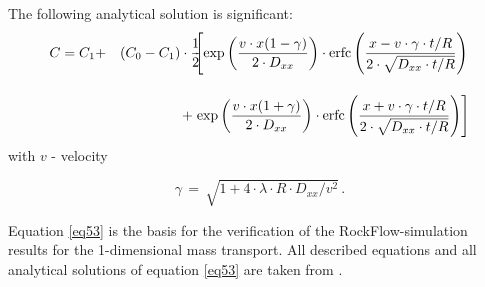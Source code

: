 The following analytical solution is significant:
\begin{eqnarray}
C=C_1&+&\left(C_0-C_1\right)\cdot\frac{1}{2}
\mbox{\hspace{-1.5ex}}\cdot\mbox{\hspace{-1.5ex}}
\left[
\exp
\left(
\frac{v\cdot x(1-\gamma)}{2\cdot D_{xx}}
\right)
\cdot\mathrm{erfc}
\left(
\frac{x-v\cdot\gamma\cdot t/R}{2\cdot \sqrt{D_{xx}\cdot t/R}}
\right)
\right. \nonumber\\[2.5ex]
& &
+\left.
\exp
\left(
\frac{v\cdot x(1+\gamma)}{2\cdot D_{xx}}
\right)
\cdot\mathrm{erfc}
\left(
\frac{x+v\cdot\gamma\cdot t/R}{2\cdot \sqrt{D_{xx}\cdot t/R}}
\right)
\right]
\label{eq53}
\end{eqnarray}
{\small
with $v$ - velocity
}

\begin{equation}
\gamma\,=\,
\sqrt{1+4\cdot\lambda\cdot R\cdot D_{xx}/v^2}\,.
\label{eq54}
\end{equation}

Equation \ref{eq53} is the basis for the verification of the RockFlow-simulation results for the 1-dimensional mass transport. All described equations and all analytical solutions of equation \ref{eq53} are taken from \cite{Hab:01}. 